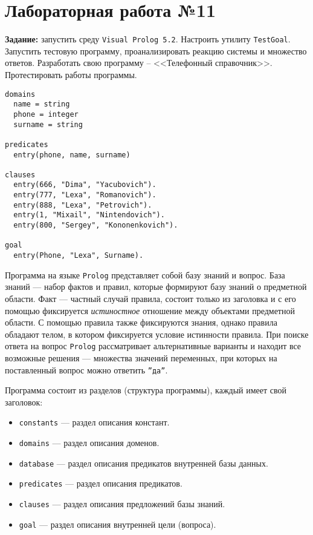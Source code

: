 \chapter{Лабораторная работа №11}

\textbf{Задание:} запустить среду \texttt{Visual Prolog 5.2}.  Настроить утилиту \texttt{TestGoal}. Запустить тестовую программу, проанализировать реакцию системы и множество ответов. Разработать свою программу – <<Телефонный справочник>>. Протестировать работы программы.

\begin{lstlisting}
domains
  name = string
  phone = integer
  surname = string
  
predicates
  entry(phone, name, surname)

clauses
  entry(666, "Dima", "Yacubovich").
  entry(777, "Lexa", "Romanovich").
  entry(888, "Lexa", "Petrovich").
  entry(1, "Mixail", "Nintendovich").
  entry(800, "Sergey", "Kononenkovich").
  
goal
  entry(Phone, "Lexa", Surname).
\end{lstlisting}

Программа на языке \texttt{Prolog} представляет собой базу знаний и вопрос. База знаний --- набор фактов и правил, которые формируют базу знаний о предметной области. Факт --- частный случай правила, состоит только из заголовка и с его помощью фиксируется \textit{истиностное} отношение между объектами предметной области. С помощью правила также фиксируются знания, однако правила обладают телом, в котором фиксируется условие истинности правила. При поиске ответа на вопрос \texttt{Prolog} рассматривает альтернативные варианты и находит все возможные решения --- множества значений переменных, при которых на поставленный вопрос можно ответить \texttt{''да''}.

Программа состоит из разделов (структура программы), каждый имеет свой заголовок:
\begin{itemize}
    \item \texttt{constants} --- раздел описания констант.
    \item \texttt{domains} --- раздел описания доменов.
    \item \texttt{database} --- раздел описания предикатов внутренней базы данных.
    \item \texttt{predicates} --- раздел описания предикатов.
    \item \texttt{clauses} --- раздел описания предложений базы знаний.
    \item \texttt{goal} --- раздел описания внутренней цели (вопроса).
\end{itemize}

